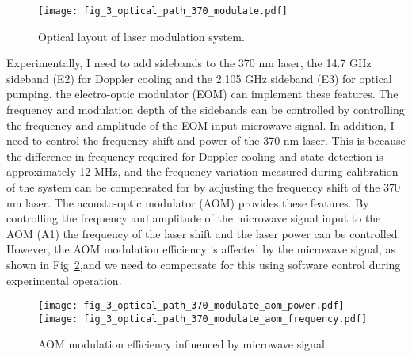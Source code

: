 \begin{figure}
    \centering
    \texttt{[image: fig\_3\_optical\_path\_370\_modulate.pdf]}
    \caption{Optical layout of laser modulation system.}
    \label{fig:fig_3_optical_path_370_modulate}
\end{figure}

Experimentally, I need to add sidebands to the 370 nm laser, the 14.7 GHz sideband (E2) for Doppler cooling and the 2.105 GHz sideband (E3) for optical pumping. the electro-optic modulator (EOM) can implement these features. The frequency and modulation depth of the sidebands can be controlled by controlling the frequency and amplitude of the EOM input microwave signal. In addition, I need to control the frequency shift and power of the 370 nm laser. This is because the difference in frequency required for Doppler cooling and state detection is approximately 12 MHz, and the frequency variation measured during calibration of the system can be compensated for by adjusting the frequency shift of the 370 nm laser. The acousto-optic modulator (AOM) provides these features. By controlling the frequency and amplitude of the microwave signal input to the AOM (A1) the frequency of the laser shift and the laser power can be controlled. However, the AOM modulation efficiency is affected by the microwave signal, as shown in Fig~\ref{fig:fig_3_optical_path_370_modulate_aom},and we need to compensate for this using software control during experimental operation.

\begin{figure}
    \centering
    {\texttt{[image: fig\_3\_optical\_path\_370\_modulate\_aom\_power.pdf]}}
    {\texttt{[image: fig\_3\_optical\_path\_370\_modulate\_aom\_frequency.pdf]}}
    \caption{AOM modulation efficiency influenced by microwave signal.}
    \label{fig:fig_3_optical_path_370_modulate_aom}
\end{figure}

